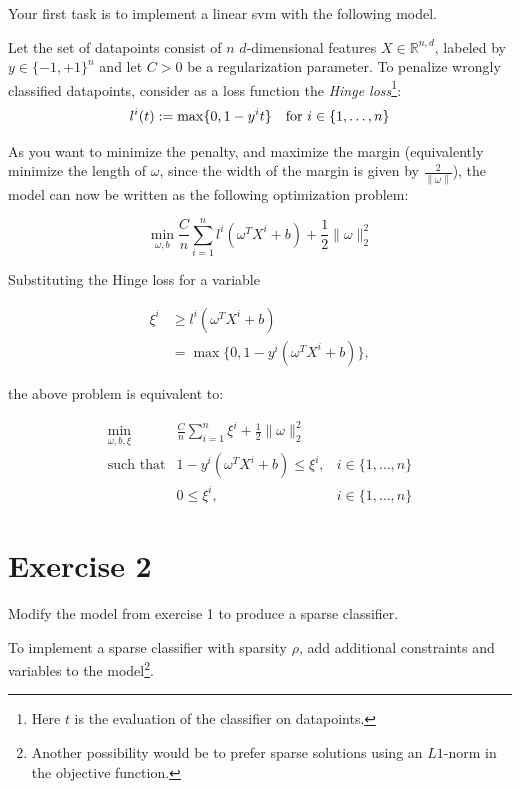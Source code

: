 \documentclass[11pt]{article}
\newcommand{\R}{\mathbb{R}}
\newcommand{\norm}[1]{\left\lVert#1\right\rVert}
\begin{document}
Your first task is to implement a linear svm with the following model.

Let the set of datapoints consist of $n$ $d$-dimensional features $X \in \R^{n,d}$, labeled by $y \in \{-1,+1\}^{n}$ and let $C > 0$ be a regularization parameter.
To penalize wrongly classified datapoints, consider as a loss function the \emph{Hinge loss}\footnote{
  Here $t$ is the evaluation of the classifier on datapoints.}:
$$l^{i}(t) :=  \max \{0, 1 - y^i t\} \text{\quad for } i \in \{1,\dots, n\}$$

As you want to minimize the penalty, and maximize the margin (equivalently minimize the length of $\omega$, since the width of the margin is given by $\frac{2}{\norm{\omega}}$), the model can now be written as the following optimization problem:

$$
\min\limits_{\omega, b}
\frac{C}{n} \sum\limits_{i = 1}^{n} l^i(\omega^{T}X^{i} + b)
+\frac{1}{2} \lVert \omega \rVert_{2}^{2}
$$

Substituting the Hinge loss for a variable

$$ \begin{aligned}
\xi^i &\geq l^i( \omega^T X^i + b ) \\
&= \max \{0, 1 - y^i (\omega^TX^i + b) \},
\end{aligned} $$

the above problem is equivalent to:

\begin{equation*}
\begin{array}{rll}
  \min\limits_{\omega, b, \xi}
  & \frac{C}{n} \sum\limits_{i = 1}^n \xi^i + \frac{1}{2} \lVert \omega \rVert_2^2
\\
  \text{such that}
  & 1 - y^i (\omega^T X^i +b) \leq \xi^i,
  & i \in \{1,\dots,n\}
\\
  & 0 \leq \xi^i,
  & i \in \{1,\dots, n\}
\end{array}
\end{equation*}

\section*{Exercise 2}

Modify the model from exercise 1 to produce a sparse classifier.

To implement a sparse classifier with sparsity $\rho$, add additional constraints and variables to the model\footnote{
  Another possibility would be to prefer sparse solutions using an $L1$-norm in the objective function.}.
\end{document}
